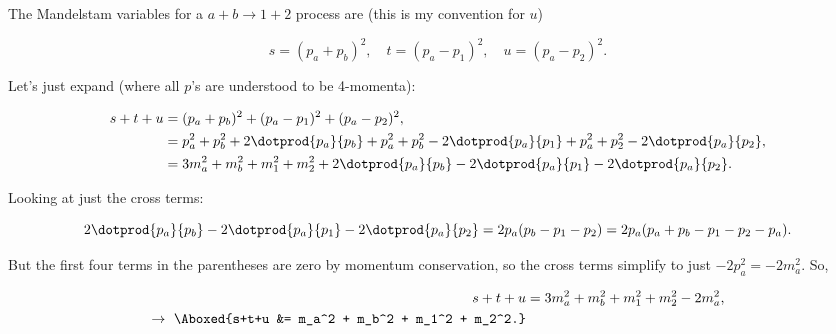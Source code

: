 \section{}

The Mandelstam variables for a $a+b \rightarrow 1+2$ process are (this is my convention for $u$)

\begin{equation}
    s = (p_a + p_b)^2, \quad t = (p_a - p_1)^2, \quad u = (p_a - p_2)^2.
\end{equation}

Let's just expand (where all $p$'s are understood to be 4-momenta):

\begin{align*}
    s+t+u &= (p_a + p_b)^2 + (p_a - p_1)^2 + (p_a - p_2)^2, \\
    &= p_a^2 + p_b^2 + 2\dotprod{p_a}{p_b} + p_a^2 + p_b^2 - 2\dotprod{p_a}{p_1} + p_a^2 + p_2^2 - 2\dotprod{p_a}{p_2}, \\
    &= 3m_a^2 + m_b^2 + m_1^2 + m_2^2 + 2\dotprod{p_a}{p_b} - 2\dotprod{p_a}{p_1} - 2\dotprod{p_a}{p_2}.
\end{align*}

Looking at just the cross terms:

\begin{equation*}
    2\dotprod{p_a}{p_b} - 2\dotprod{p_a}{p_1} - 2\dotprod{p_a}{p_2} = 2p_a(p_b - p_1 - p_2) = 2p_a(p_a + p_b - p_1 - p_2 - p_a).
\end{equation*}

But the first four terms in the parentheses are zero by momentum conservation, so the cross terms simplify to just $-2p_a^2 = -2m_a^2$. So, 

\begin{align*}
    s+t+u &= 3m_a^2 + m_b^2 + m_1^2 + m_2^2 - 2m_a^2, \\
    \rightarrow\ \Aboxed{s+t+u &= m_a^2 + m_b^2 + m_1^2 + m_2^2.}
\end{align*}
